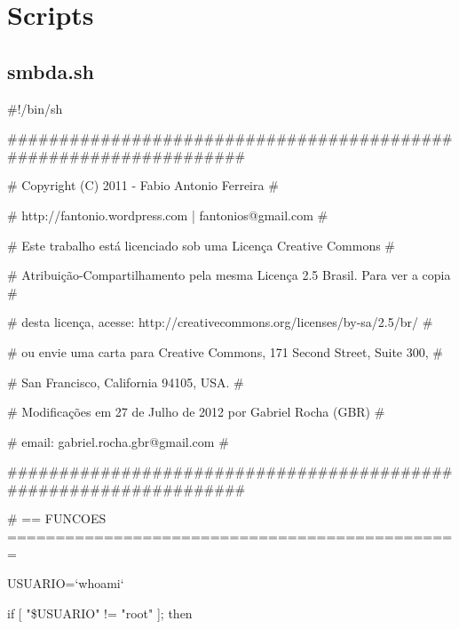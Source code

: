 \appendix

\chapter{Scripts}

\section{smbda.sh}

\#!/bin/sh
 
\#\#\#\#\#\#\#\#\#\#\#\#\#\#\#\#\#\#\#\#\#\#\#\#\#\#\#\#\#\#\#\#\#\#\#\#\#\#\#\#\#\#\#\#\#\#\#\#\#\#\#\#\#\#\#\#\#\#\#\#\#\#\#\#\#\#

\# Copyright (C) 2011 - Fabio Antonio Ferreira \hspace{160pt} \#

\# http://fantonio.wordpress.com | fantonios@gmail.com \hspace{106pt} \#

\# Este trabalho está licenciado sob uma Licença Creative Commons \hspace{59pt} \#

\# Atribuição-Compartilhamento pela mesma Licença 2.5 Brasil. Para ver a copia \#

\# desta licença, acesse: http://creativecommons.org/licenses/by-sa/2.5/br/ \hspace{34pt} \#

\# ou envie uma carta para Creative Commons, 171 Second Street, Suite 300, \hspace{19pt} \#

\# San Francisco, California 94105, USA. \hspace{188pt} \#

\# Modificações em 27 de Julho de 2012 por Gabriel Rocha (GBR) \hspace{67pt}             \#

\# email: gabriel.rocha.gbr@gmail.com \hspace{198pt} \#

\#\#\#\#\#\#\#\#\#\#\#\#\#\#\#\#\#\#\#\#\#\#\#\#\#\#\#\#\#\#\#\#\#\#\#\#\#\#\#\#\#\#\#\#\#\#\#\#\#\#\#\#\#\#\#\#\#\#\#\#\#\#\#\#\#\#

\# == FUNCOES ===============================================

USUARIO=`whoami`

if [ "\$USUARIO" != "root" ]; then

